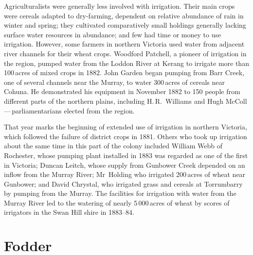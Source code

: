 Agriculturalists were generally less involved with irrigation. Their
ma\-in crops were cereals adapted to dry-farming, dependent on
relative abundance of rain in winter and spring; they cultivated
comparatively small holdings generally lacking surface water resources
in abundance; and few had time or money to use irrigation.  However,
some farmers in northern Victoria used water from adjacent river
channels for their wh\-eat crops.  Woodford Patchell,  a pioneer of irrigation in the region, pumped water from the
Loddon River
 at Kerang  
to irrigate more than 100\,acres of mixed crops in 1882. John Garden
began pumping from Barr Creek,  one of several
channels near the Murray, to water 300\,acres of cereals near
Cohuna. He demonstrated his equipment in November 1882
to 150 people from different parts of the northern plains, including
H.\,R.~Williams  and  Hugh
McColl\,---\,parliamentarians elected from the region.

That year marks the beginning of extended use of irrigation in
northern Victoria, which followed the failure of district crops in
1881. Others who took up irrigation about the same time in this part
of the colony included William Webb  of Rochester,
whose pumping plant installed in 1883 was regarded as one of the first
in Victoria; Duncan Leitch,  whose supply from
Gunbower Creek  depended on an inflow from the
Murray River;  Mr~Holding who irrigated 200\,acres
of wheat near Gunbower; and David Chrystal,  who
irrigated grass and cereals at Torrumbarry 
by pumping from the Murray. The facilities for irrigation with water
from the Murray River led to the watering of nearly 5\,000\,acres of
wheat by scores of irrigators in the Swan Hill 
shire in 1883--84.

\section*{Fodder}


